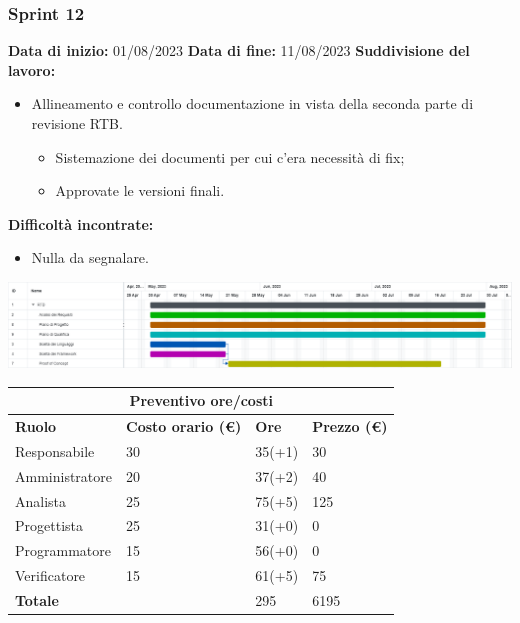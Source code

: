 \documentclass[a4paper, 12pt]{article}
\begin{document}
\subsubsection{Sprint 12}
\textbf{Data di inizio:} 01/08/2023\newline
\textbf{Data di fine:} 11/08/2023\newline
\newline
\textbf{Suddivisione del lavoro:}
\begin{itemize}
	\item Allineamento e controllo documentazione in vista della seconda parte di revisione RTB.
	      \begin{itemize}
		      \item Sistemazione dei documenti per cui c'era necessità di fix;
		      \item Approvate le versioni finali.
	      \end{itemize}
\end{itemize}
\textbf{Difficoltà incontrate:}
\begin{itemize}
	\item Nulla da segnalare.
\end{itemize}
\includegraphics[scale=0.178]{RTB_10e11.png}\newline
\newline
\begin{center}
	\begin{tabularx}{\textwidth}{|X|X|X|X|}
		\hline
		\multicolumn{4}{|c|}{\textbf{Preventivo ore/costi}}                                      \\
		\hline
		\hline
		\textbf{Ruolo}  & \textbf{Costo orario (\euro)} & \textbf{Ore} & \textbf{Prezzo (\euro)} \\
		\hline
		Responsabile    & 30                            & 35(+1)       & 30                      \\
		\hline
		Amministratore  & 20                            & 37(+2)       & 40                      \\
		\hline
		Analista        & 25                            & 75(+5)       & 125                     \\
		\hline
		Progettista     & 25                            & 31(+0)       & 0                       \\
		\hline
		Programmatore   & 15                            & 56(+0)       & 0                       \\
		\hline
		Verificatore    & 15                            & 61(+5)       & 75                      \\
		\hline
		\hline
		\textbf{Totale} &                               & 295          & 6195                    \\
		\hline
	\end{tabularx}\\[8pt]
	\mbox{}\\
\end{center}
\end{document}
